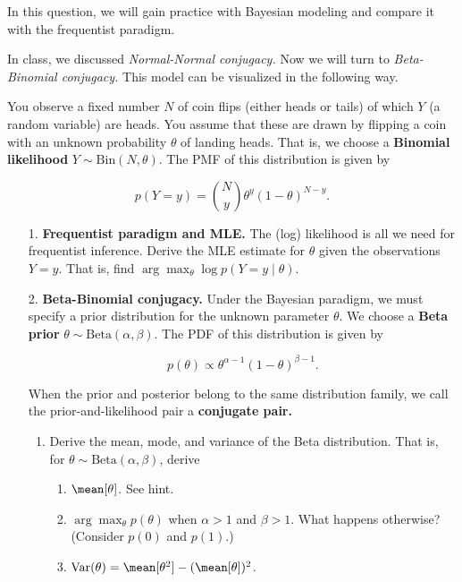 \documentclass[submit]{harvardml}
\begin{document}
\begin{problem}
  
  In this question, we will gain practice with Bayesian modeling and
  compare it with the frequentist paradigm.
  
  In class, we discussed \emph{Normal-Normal conjugacy.} Now
  we will turn to \emph{Beta-Binomial conjugacy.} This model can be
  visualized in the following way.
  
  You observe a fixed number \(N\) of coin flips (either
  heads or tails) of which \(Y\) (a random variable) are heads. You assume that these are
  drawn by flipping a coin with an unknown probability \(\theta\) of
  landing heads. That is, we choose a \textbf{Binomial likelihood}
  \(Y \sim \mathrm{Bin}(N, \theta)\). The PMF of this distribution is
  given by
  
  \[
  p(Y=y) = {N \choose y} \theta^{y} (1-\theta)^{N-y}.
  \]
  
  \begin{enumerate}
  \item[1.]
    \textbf{Frequentist paradigm and MLE.} The (log) likelihood is all we
    need for frequentist inference. Derive the MLE estimate for \(\theta\)
    given the observations \(Y = y\). That is, find
    \(\arg \max_{\theta} \log p(Y = y \mid \theta)\).
  
  \item[2.]
    \textbf{Beta-Binomial conjugacy.} Under the Bayesian paradigm, we must specify a
    prior distribution for the unknown parameter \(\theta\). We choose a \textbf{Beta prior}
    \(\theta \sim \mathrm{Beta}(\alpha, \beta)\). The PDF of this
    distribution is given by
    
    \[
    p(\theta) \propto \theta^{\alpha - 1} (1-\theta)^{\beta - 1}.
    \]
    
    When the prior and posterior belong to the same distribution family, we
    call the prior-and-likelihood pair a \textbf{conjugate pair.}
    
    \begin{enumerate}
      \item Derive the mean, mode, and variance of the Beta distribution. That is, for $\theta \sim \mathrm{Beta}(\alpha, \beta)$, derive
      
      \begin{enumerate}
        \item $\mean[\theta]$. See hint. \footnotemark[1]
        \item $\arg \max_{\theta} p(\theta)$ when $\alpha > 1$ and $\beta > 1$. What happens otherwise? (Consider $p(0)$ and $p(1)$.)
        \item $\mathrm{Var}(\theta) = \mean[\theta^2] - (\mean[\theta])^2$.
      \end{enumerate}


\end{enumerate}
\end{enumerate}
\end{problem}
\end{document}
